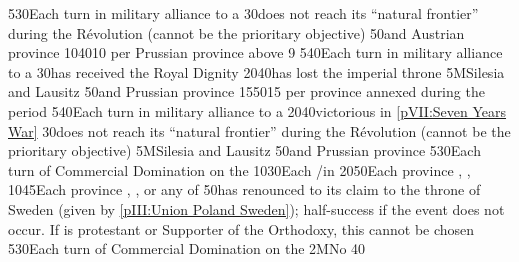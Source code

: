 %
%
{5}{30}{Each turn in military alliance to a \MAJ}%
%
%
{}{30}{\paysmajeurFrance does not reach its ``natural frontier'' during the
  Révolution (cannot be the prioritary objective)}%
%
%
{}{50}{\provinceSilesie and \provinceLausitz Austrian province}%
%
 
%
%
{10}{40}{10 \VPs per Prussian province above 9}%
%
%
{5}{40}{Each turn in military alliance to a \MAJ}%
%
%
{}{30}{\paysmajeurPrusse has received the Royal Dignity}%
%
%
{20}{40}{\AUS has lost the imperial throne}%
%
\EUobjective5M{Silesia and Lausitz}{}%
{}{50}{\provinceSilesie and \provinceLausitz Prussian province}%
%
%
%
{15}{50}{15 \VPs per province annexed during the period}%
%
%
{5}{40}{Each turn in military alliance to a \MAJ}%
%
%
{20}{40}{\PRU victorious in \ref{pVII:Seven Years War}}%
%
%
{}{30}{\paysmajeurFrance does not reach its ``natural frontier'' during the
  Révolution (cannot be the prioritary objective)}%
%
\EUobjective5M{Silesia and Lausitz}{}%
{}{50}{\provinceSilesie and \provinceLausitz Prussian province}%
%
 
%
%
{5}{30}{Each turn of Commercial Domination on the }%
%
%
%
{10}{30}{Each \COL/\TP in }%
%
%
{20}{50}{Each province \provinceNeva, \provinceLivonija, \provinceEstland}%
%
%
{10}{45}{Each province \provinceSkane, \provinceVastergotland,
  \provinceGotland or any of \regionNorvege}%
%
%
{}{50}{\POL has renounced to its claim to the throne of Sweden (given by
  \ref{pIII:Union Poland Sweden}); half-success if the event does not
  occur. If \POL is protestant or Supporter of the Orthodoxy, this cannot be
  chosen}%
%
%
%
{5}{30}{Each turn of Commercial Domination on the }%
%
\EUobjective2M{No }{}%
{}{40}{}%
%
%
